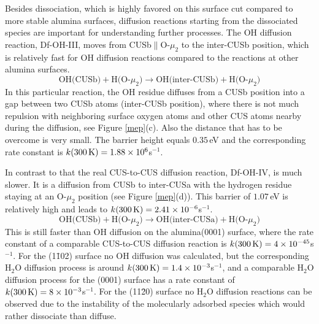 \documentclass[11pt,DIV=13,BCOR=5mm,a4paper,headinclude]{scrbook}
\begin{document}


Besides dissociation, which is highly favored on this surface cut compared to more stable alumina surfaces\cite{Heiden11-20_2018}, diffusion reactions starting from the dissociated species are important for understanding further processes.
The OH diffusion reaction, Df-OH-III, moves from CUSb$\parallel$O-$\mu_2$ to the inter-CUSb position, which is relatively fast for OH diffusion reactions compared to the reactions at other alumina surfaces\cite{WirthJPCC2012,Wirth2016}.
\begin{equation}
 \text{OH(CUSb)} + \text{H(O-$\mu_2$)} \rightarrow \text{OH(inter-CUSb)} + \text{H(O-$\mu_2$)} \tag{Df-OH-III}
     \label{diffOHa}
\end{equation}
In this particular reaction, the OH residue diffuses from a CUSb position into a gap between two CUSb atoms (inter-CUSb position), where there is not much repulsion with neighboring surface oxygen atoms and other CUS atoms nearby during the diffusion, see Figure \ref{mep}(c).
Also the distance that has to be overcome is very small.
The barrier height equals $0.35\,$eV and the corresponding rate constant is $k(\textrm{300\,K})=1.88\times 10^6$s$^{-1}$.


In contrast to that the real CUS-to-CUS diffusion reaction, Df-OH-IV, is much slower.
It is a diffusion from CUSb to inter-CUSa with the hydrogen residue staying at an O-$\mu_2$ position (see Figure \ref{mep}(d)).
This barrier of $1.07\,$eV is relatively high and leads to $k(\textrm{300\,K})=2.41\times 10^{-6}$s$^{-1}$.
\begin{equation}
 \text{OH(CUSb)} + \text{H(O-$\mu_2$)} \rightarrow \text{OH(inter-CUSa)} + \text{H(O-$\mu_2$)} \tag{Df-OH-IV}
     \label{diffOHb}
\end{equation}
This is still faster than OH diffusion on the alumina(0001) surface\cite{WirthJPCC2012,Wirth2014thesis}, where the rate constant of a comparable CUS-to-CUS diffusion reaction is $k(\textrm{300\,K})=4\times 10^{-45}$s$^{-1}$.
For the (1\=102) surface no OH diffusion was calculated, but the corresponding H$_2$O diffusion process is around $k(\textrm{300\,K})=1.4\times 10^{-3}$s$^{-1}$, and a comparable H$_2$O diffusion process for the (0001) surface has a rate constant of $k(\textrm{300\,K})=8\times 10^{-3}$s$^{-1}$.
For the (11\=20) surface no H$_2$O diffusion reactions can be observed due to the instability of the molecularly adsorbed species which would rather dissociate than diffuse.
\end{document}
